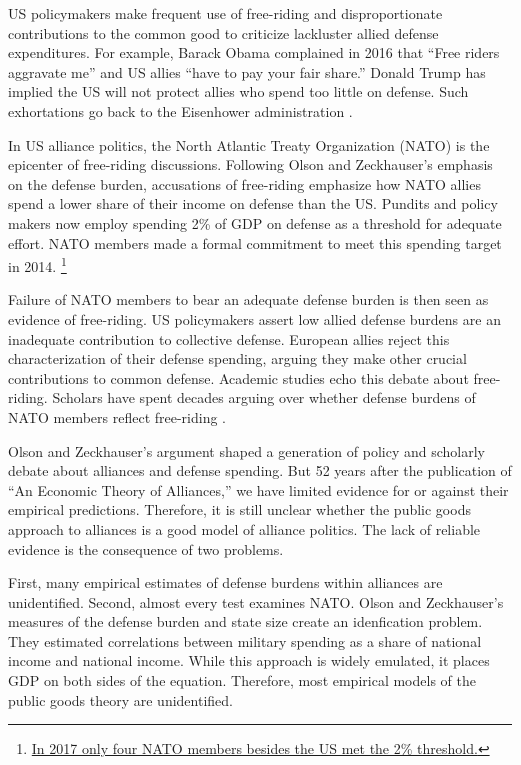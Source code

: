 \documentclass[12pt]{article}
\begin{document}
US policymakers make frequent use of free-riding and disproportionate contributions to the common good to criticize lackluster allied defense expenditures.  
For example, Barack Obama complained in 2016 that ``Free riders aggravate me'' and US allies ``have to pay your fair share.'' 
Donald Trump has implied the US will not protect allies who spend too little on defense. 
Such exhortations go back to the Eisenhower administration \citep{Lanoszka2015}.


In US alliance politics, the North Atlantic Treaty Organization (NATO) is the epicenter of free-riding discussions. 
Following Olson and Zeckhauser's emphasis on the defense burden, accusations of free-riding emphasize how NATO allies spend a lower share of their income on defense than the US. 
Pundits and policy makers now employ spending 2\% of GDP on defense as a threshold for adequate effort.
NATO members made a formal commitment to meet this spending target in 2014.
\footnote{\href{https://www.economist.com/graphic-detail/2017/02/16/military-spending-by-nato-members}{In 2017 only four NATO members besides the US met the 2\% threshold.}}  


Failure of NATO members to bear an adequate defense burden is then seen as evidence of free-riding. 
US policymakers assert low allied defense burdens are an inadequate contribution to collective defense. 
European allies reject this characterization of their defense spending, arguing they make other crucial contributions to common defense. 
Academic studies echo this debate about free-riding.  
Scholars have spent decades arguing over whether defense burdens of NATO members reflect free-riding \citep{SandlerForbes1980, Palmer1990, GatesTerasawa1992, SandlerHartley2001, Lanoszka2015, PluemperNeumayer2015}.


Olson and Zeckhauser's argument shaped a generation of policy and scholarly debate about alliances and defense spending. 
But 52 years after the publication of ``An Economic Theory of Alliances,'' we have limited evidence for or against their empirical predictions. 
Therefore, it is still unclear whether the public goods approach to alliances is a good model of alliance politics. 
The lack of reliable evidence is the consequence of two problems. 


First, many empirical estimates of defense burdens within alliances are unidentified.
Second, almost every test examines NATO. 
Olson and Zeckhauser's measures of the defense burden and state size create an idenfication problem. 
They estimated correlations between military spending as a share of national income and national income.
While this approach is widely emulated, it places GDP on both sides of the equation.
Therefore, most empirical models of the public goods theory are unidentified.
\end{document}
